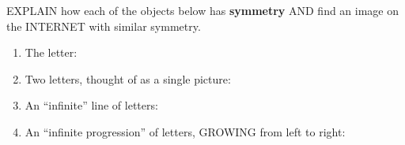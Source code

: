 \documentclass[noauthor,nooutcomes,12pt,handout]{ximera}
\begin{document}
\begin{question}
  EXPLAIN how each of the objects below has \textbf{symmetry} AND find
  an image on the INTERNET with similar symmetry.
  \begin{enumerate}
  \item The letter:
    \begin{center}
    \end{center}
  \item Two letters, thought of as a single picture:
    \begin{center}
    \end{center}
  \item An ``infinite'' line of letters:
    \begin{center}
    \end{center}
  \item An ``infinite progression'' of letters, GROWING from left to
    right:
    \begin{center}
    \end{center}
  \end{enumerate}


\end{question}
\end{document}

